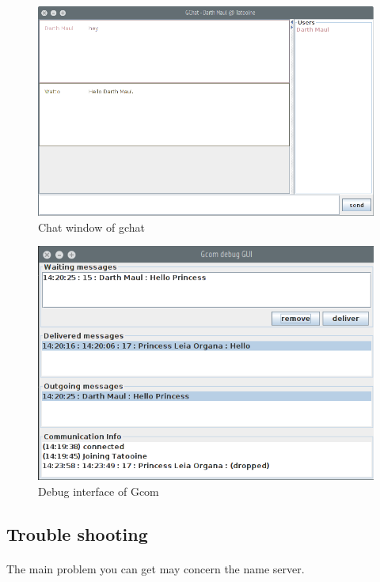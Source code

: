 \begin{figure}[h]
    \begin{center}
        \includegraphics[scale=0.4]{figures/gchat_chat.png}
    \end{center}
    \caption{Chat window of gchat}
    \label{fig:gchat_connectchat}
\end{figure}



	
\begin{figure}[h]
    \begin{center}
        \includegraphics[scale=0.5]{figures/debug_window.png}
    \end{center}
    \caption{Debug interface of Gcom}
    \label{fig:debugGui}
\end{figure}

\subsection{Trouble shooting}
\paragraph{}{
    The main problem you can get may concern the name server.
}

